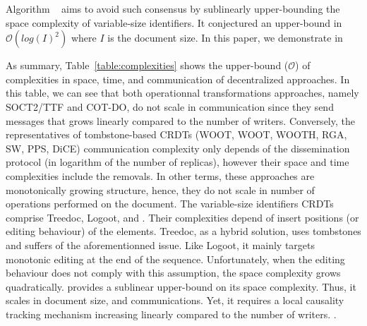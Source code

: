 \begin{asparadesc}
  Algorithm \LSEQ~\cite{nedelec2013lseq} aims to avoid such consensus by
  sublinearly upper-bounding the space complexity of variable-size
  identifiers. It conjectured an upper-bound in $\mathcal{O}(log(I)^2)$ where
  $I$ is the document size. In this paper, we demonstrate in 

\item [As summary,] Table~\ref{table:complexities} shows the upper-bound
  ($\mathcal{O}$) of complexities in space, time, and communication of
  decentralized approaches. In this table, we can see that both operationnal
  transformations approaches, namely SOCT2/TTF and COT-DO, do not scale in
  communication since they send messages that grows linearly compared to the
  number of writers. Conversely, the representatives of tombstone-based CRDTs
  (WOOT, WOOT, WOOTH, RGA, SW, PPS, DiCE) communication complexity only depends
  of the dissemination protocol (in logarithm of the number of replicas),
  however their space and time complexities include the removals. In other
  terms, these approaches are monotonically growing structure, hence, they do
  not scale in number of operations performed on the document. The variable-size
  identifiers CRDTs comprise Treedoc, Logoot, and \LSEQ. Their complexities
  depend of insert positions (or editing behaviour) of the elements. Treedoc, as
  a hybrid solution, uses tombstones and suffers of the aforementionned
  issue. Like Logoot, it mainly targets monotonic editing at the end of the
  sequence. Unfortunately, when the editing behaviour does not comply with this
  assumption, the space complexity grows quadratically. \LSEQ provides a
  sublinear upper-bound on its space complexity. Thus, it scales in document
  size, and communications. Yet, it requires a local causality tracking
  mechanism increasing linearly compared to the number of
  writers. .
\end{asparadesc}

